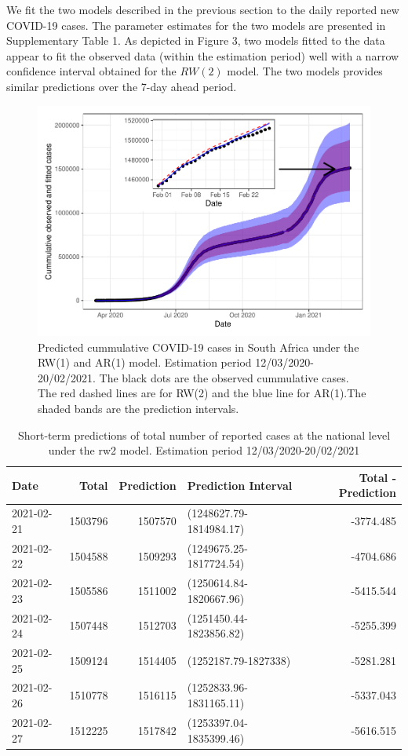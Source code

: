\documentclass[10pt,letterpaper]{article}
\begin{document}
We fit the two models described in the previous section to the daily
reported new COVID-19 cases. The parameter estimates for the two models
are presented in Supplementary Table 1. As depicted in Figure 3, two
models fitted to the data appear to fit the observed data (within the
estimation period) well with a narrow confidence interval obtained for
the \(RW(2)\) model. The two models provides similar predictions over
the 7-day ahead period.

\begin{figure}[H]
\includegraphics[width=0.99\linewidth]{COVIDincidenceSA_files/figure-latex/predd-1} \caption{Predicted cummulative COVID-19 cases in South Africa under the RW(1) and AR(1) model. Estimation period 12/03/2020-20/02/2021. The black dots are the observed cummulative cases. The red dashed lines are for RW(2) and the blue line for AR(1).The shaded bands are the prediction intervals. }\label{fig:predd}
\end{figure}

\begin{table}[!h]

\caption{\label{tab:unnamed-chunk-10}Short-term predictions of total number of reported cases at the national level under the rw2 model. Estimation period 12/03/2020-20/02/2021}
\centering
\begin{tabular}[t]{l|r|r|l|r}
\hline
Date & Total & Prediction & Prediction Interval & Total - Prediction\\
\hline
2021-02-21 & 1503796 & 1507570 & (1248627.79-1814984.17) & -3774.485\\
\hline
2021-02-22 & 1504588 & 1509293 & (1249675.25-1817724.54) & -4704.686\\
\hline
2021-02-23 & 1505586 & 1511002 & (1250614.84-1820667.96) & -5415.544\\
\hline
2021-02-24 & 1507448 & 1512703 & (1251450.44-1823856.82) & -5255.399\\
\hline
2021-02-25 & 1509124 & 1514405 & (1252187.79-1827338) & -5281.281\\
\hline
2021-02-26 & 1510778 & 1516115 & (1252833.96-1831165.11) & -5337.043\\
\hline
2021-02-27 & 1512225 & 1517842 & (1253397.04-1835399.46) & -5616.515\\
\hline
\end{tabular}
\end{table}
\end{document}
